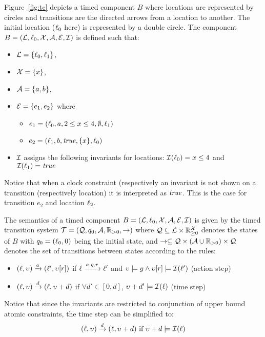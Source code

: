 \begin{example}
  Figure~\ref{fig:tc} depicts a timed component $B$ where locations
  are represented by circles and transitions are the directed arrows
  from a location to another. The initial location ($\ell_0$ here) is
  represented by a double circle. The component 
  $B=(\mathcal{L},\ell_0,\mathcal{X},\mathcal{A},\mathcal{E},\mathcal{I})$ is defined such that:
  \begin{itemize}
    \item $\mathcal{L}=\{\ell_0,\ell_1\}$,
    \item $\mathcal{X}=\{x\}$,
    \item $\mathcal{A}=\{a,b\}$,
    \item $\mathcal{E}=\{e_1,e_2\}$ where
      \begin{itemize}
        \item $e_1=(\ell_0,a,2\le x\le4,\emptyset,\ell_1)$
        \item $e_2=(\ell_1,b,\textnormal{\textit{true}},\{x\},\ell_0)$
      \end{itemize}
    \item $\mathcal{I}$ assigns the following invariants for locations: 
      $\mathcal{I}(\ell_0)=x\le4$ and $\mathcal{I}(\ell_1)=\textnormal{\textit{true}}$
  \end{itemize}
  Notice that when a clock constraint (respectively an invariant is not
  shown on a transition (respectively location) it is interpreted as $\textnormal{\textit{true}}$.
  This is the case for transition $e_2$ and location $\ell_2$.
\end{example}


\begin{definition}\label{def:std_sem}
The semantics of a timed component $B=(\mathcal{L},\ell_0,\mathcal{X},\mathcal{A},\mathcal{E},\mathcal{I})$ is given by the timed transition
  system $\mathcal{T}=(\mathcal{Q},q_0,\mathcal{A},\mathbb{R}_{> 0},\to)$ where $\mathcal{Q}\subseteq\mathcal{L}\times\mathbb{R}_{\ge 0}^{\mathcal{X}}$ denotes the states
  of $B$ with $q_0=(\ell_0,0)$ being the initial state, 
  and $\to\subseteq\mathcal{Q}\times(\mathcal{A}\cup\mathbb{R}_{> 0})\times\mathcal{Q}$
  denotes the set of transitions between states according to the rules:
  \begin{itemize}
    \item $(\ell,\upsilon)\xrightarrow{a}(\ell',\upsilon[r])$ if $\ell\xrightarrow{a,g,r}
      \ell'$ and $\upsilon\models g\wedge\upsilon[r]\models\mathcal{I}(\ell')$
      (action step) 
    \item $(\ell,\upsilon)\xrightarrow{d}(\ell,\upsilon+d)$ if $\forall d'\in[0,d]$,
      $\upsilon+d'\models \mathcal{I}(\ell)$ (time step) 
  \end{itemize}
\end{definition}
Notice that since the invariants are restricted to conjunction of upper bound
atomic constraints, the time step can be simplified to:
\begin{displaymath}
  (\ell,\upsilon)\xrightarrow{d}(\ell,\upsilon+d)\text{ if }\upsilon+d\models \mathcal{I}(\ell) 
\end{displaymath}

